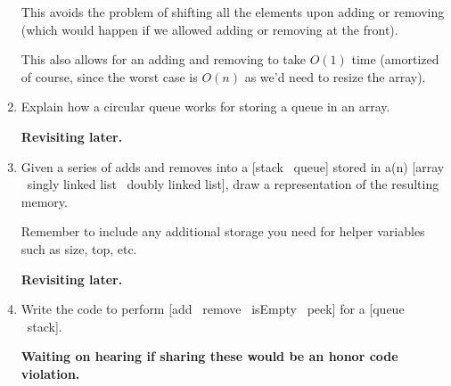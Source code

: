 \documentclass[10pt]{article}
\begin{document}
\begin{enumerate}[leftmargin=0em]
    This avoids the problem of shifting all the elements upon adding or removing (which would happen if we allowed adding or removing at the front).
    
    This also allows for an adding and removing to take $O(1)$ time (amortized of course, since the worst case is $O(n)$ as we'd need to resize the array).
    \item Explain how a circular queue works for storing a queue in an array.
    
    \textbf{Revisiting later.}
    \item Given a series of adds and removes into a [stack \vline\ queue] stored in a(n) [array \vline\ singly linked list \vline\ doubly linked list], draw a representation of the resulting memory.
    
    Remember to include any additional storage you need for helper variables such as size, top, etc.

    \textbf{Revisiting later.}
    \item Write the code to perform [add \vline\ remove \vline\ isEmpty \vline\ peek] for a [queue \vline\ stack].
    
    \textbf{Waiting on hearing if sharing these would be an honor code violation.}
\end{enumerate}
\end{document}
